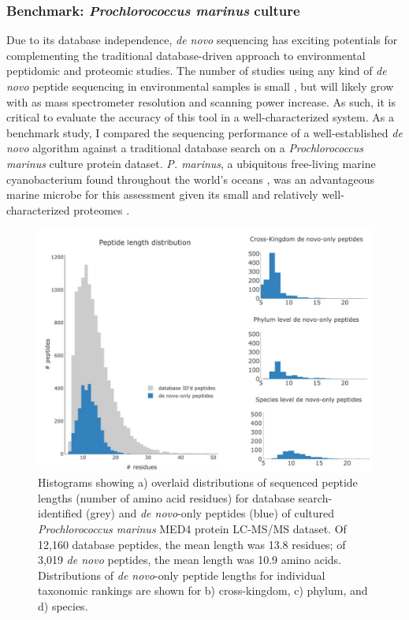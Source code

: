 \documentclass[12pt, letterpaper, twoside]{article}
\begin{document}
\subsubsection{Benchmark: \textit{Prochlorococcus marinus} culture}

Due to its database independence, \textit{de novo} sequencing has exciting potentials for complementing the traditional database-driven approach to environmental peptidomic and proteomic studies. The number of studies using any kind of \textit{de novo} peptide sequencing in environmental samples is small \cite{muth_evaluating_nodate}, but will likely grow with as mass spectrometer resolution and scanning power increase. As such, it is critical to evaluate the accuracy of this tool in a well-characterized system. As a benchmark study, I compared the sequencing performance of a well-established \textit{de novo} algorithm against a traditional database search on a \textit{Prochlorococcus marinus} culture protein dataset. \textit{P. marinus}, a ubiquitous free-living marine cyanobacterium found throughout the world’s oceans \cite{chisholm_novel_1988}, was an advantageous marine microbe for this assessment given its small and relatively well-characterized proteomes \cite{paul_distinct_2010}.

\begin{figure}
	\includegraphics[width=\linewidth]{fig1-denovo.jpg}
	\caption{Histograms showing a) overlaid distributions of sequenced peptide lengths (number of amino acid residues) for database search-identified (grey) and \textit{de novo}-only peptides (blue) of cultured \textit{Prochlorococcus marinus} MED4 protein LC-MS/MS dataset. Of 12,160 database peptides, the mean length was 13.8 residues; of 3,019 \textit{de novo} peptides, the mean length was 10.9 amino acids. Distributions of \textit{de novo}-only peptide lengths for individual taxonomic rankings are shown for b) cross-kingdom, c) phylum, and d) species.}
	\label{fig:de-novo-hists}
\end{figure}
\end{document}
